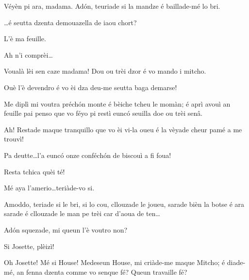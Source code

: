 \begin{drama}
\MedMitchospeaks Véyèn pi ara, madama. Ad\'on, teuriade si la mandze é baillade-mé lo bri.


\MedMitchospeaks{} \ldots é seutta dzenta demouazella de iaou chort?

\Gerominespeaks L’è ma feuille.

\MedMitchospeaks Ah n’i comprèi\ldots


\MedMitchospeaks Voualà lèi sen caze madama! Dou ou trèi dzor é vo mando i mitcho.

\Gerominespeaks Ouè l’è devendro é vo èi dza deu-me seutta baga demarse!

\MedMitchospeaks Me diplì mi voutra préch\'on monte é bèiche tcheu le momàn; é aprì avouì an feuille pai penso que vo féyo pi restì eunc\'o seuilla doe ou trèi senâ.

\Gerominespeaks Ah! Restade maque tranquillo que vo èi vi-la oueu é la vèyade cheur pamé a me trouvì!

\Casimirspeaks Pa deutte\ldots l’a eunc\'o onze conféch\'on de biscouì a fi foua!

\Gerominespeaks Resta tchica quèi té!


\MedMitchospeaks{} Mé aya l'amerio\ldots teriàde-vo si.


\MedMitchospeaks Amoddo, teriade si le bri, si lo cou, cllouzade le joueu, sarade bièn la botse é ara sarade é cllouzade le man pe trèi car d'aoua de ten\ldots 


\MedMitchospeaks{} Ad\'on squezade, mi queun l'è voutro non?

\Feliespeaks Si Josette, plèizì!

\MedMitchospeaks Oh Josette! Mé si House! Medeseun House, mi cri\-à\-de-me maque Mitcho; é diade-mé, an fenna dzenta comme vo senque fé? Queun travaille fé?


\end{drama}
